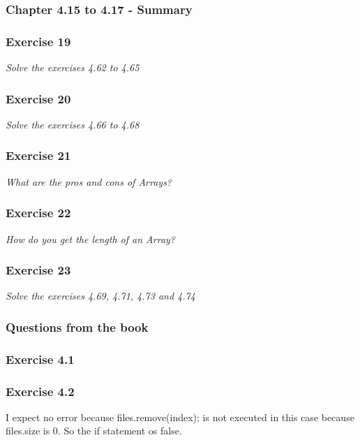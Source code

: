 \subsubsection{Chapter 4.15 to 4.17 - Summary}

\subsubsection*{Exercise 19}
\textit{Solve the exercises 4.62 to 4.65}\\

\subsubsection*{Exercise 20}
\textit{Solve the exercises 4.66 to 4.68}\\

\subsubsection*{Exercise 21}
\textit{What are the pros and cons of Arrays?}\\

\subsubsection*{Exercise 22}
\textit{How do you get the length of an Array?}\\

\subsubsection*{Exercise 23}
\textit{Solve the exercises 4.69, 4.71, 4.73 and 4.74}\\

\subsubsection{Questions from the book}

\subsubsection{Exercise 4.1}

\subsubsection{Exercise 4.2}
I expect no error because files.remove(index); is not executed in this case 
because files.size is 0. So the if statement os false. 


